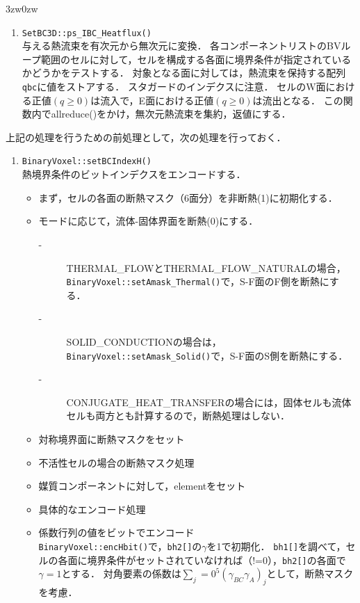 \begin{indentation}{3zw}{0zw}
{\begin{enumerate}
\item \verb|SetBC3D::ps_IBC_Heatflux()|\\
与える熱流束を有次元から無次元に変換．
各コンポーネントリストのBVループ範囲のセルに対して，セルを構成する各面に境界条件が指定されているかどうかをテストする．
対象となる面に対しては，熱流束を保持する配列\verb|qbc|に値をストアする．
スタガードのインデクスに注意．
セルのW面における正値$(q \ge 0)$は流入で，E面における正値$(q \ge 0)$は流出となる．
この関数内でallreduce()をかけ，無次元熱流束を集約，返値にする．
\end{enumerate}


上記の処理を行うための前処理として，次の処理を行っておく．
\begin{enumerate}
\item \verb|BinaryVoxel::setBCIndexH()|\\
熱境界条件のビットインデクスをエンコードする．
\begin{itemize}
\item まず，セルの各面の断熱マスク（6面分）を非断熱(1)に初期化する．
\item モードに応じて，流体-固体界面を断熱(0)にする．
\begin{description}
\item[-] THERMAL\_FLOWとTHERMAL\_FLOW\_NATURALの場合，\verb|BinaryVoxel::setAmask_Thermal()|で，S-F面のF側を断熱にする．
\item[-] SOLID\_CONDUCTIONの場合は，\verb|BinaryVoxel::setAmask_Solid()|で，S-F面のS側を断熱にする．
\item[-] CONJUGATE\_HEAT\_TRANSFERの場合には，固体セルも流体セルも両方とも計算するので，断熱処理はしない．
\end{description}

\item 対称境界面に断熱マスクをセット\\
\item 不活性セルの場合の断熱マスク処理\\
\item 媒質コンポーネントに対して，elementをセット\\
\item 具体的なエンコード処理\\
\item 係数行列の値をビットでエンコード\\
\verb|BinaryVoxel::encHbit()|で，\verb|bh2[]|の$\gamma$を1で初期化．
\verb|bh1[]|を調べて，セルの各面に境界条件がセットされていなければ（!=0），\verb|bh2[]|の各面で$\gamma=1$とする．
対角要素の係数は$\sum \limits_j=0^5 \left( \gamma_{BC} \gamma_A \right)_j$として，断熱マスクを考慮．
\end{itemize}




\end{enumerate}}
\end{indentation}
